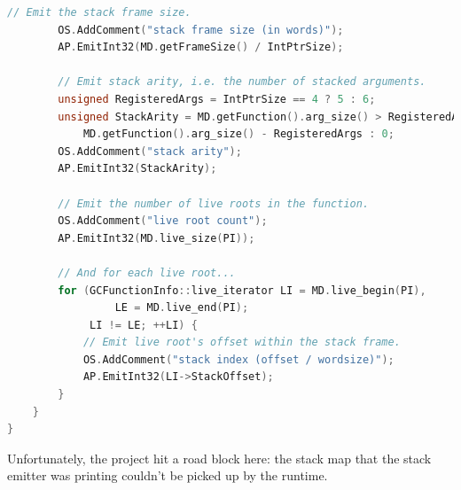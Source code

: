 \documentclass{article}
\begin{document}
\begin{lstlisting}[language=c++]
		// Emit the stack frame size.
		OS.AddComment("stack frame size (in words)");
		AP.EmitInt32(MD.getFrameSize() / IntPtrSize);

		// Emit stack arity, i.e. the number of stacked arguments.
		unsigned RegisteredArgs = IntPtrSize == 4 ? 5 : 6;
		unsigned StackArity = MD.getFunction().arg_size() > RegisteredArgs ?
			MD.getFunction().arg_size() - RegisteredArgs : 0;
		OS.AddComment("stack arity");
		AP.EmitInt32(StackArity);

		// Emit the number of live roots in the function.
		OS.AddComment("live root count");
		AP.EmitInt32(MD.live_size(PI));

		// And for each live root...
		for (GCFunctionInfo::live_iterator LI = MD.live_begin(PI),
			     LE = MD.live_end(PI);
		     LI != LE; ++LI) {
			// Emit live root's offset within the stack frame.
			OS.AddComment("stack index (offset / wordsize)");
			AP.EmitInt32(LI->StackOffset);
		}
	}
}
\end{lstlisting}
Unfortunately, the project hit a road block here: the stack map that
the stack emitter was printing couldn't be picked up by the runtime.
\end{document}
